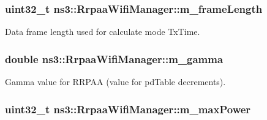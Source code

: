 \subsubsection[{\texorpdfstring{m\+\_\+frame\+Length}{m_frameLength}}]{\setlength{\rightskip}{0pt plus 5cm}uint32\+\_\+t ns3\+::\+Rrpaa\+Wifi\+Manager\+::m\+\_\+frame\+Length\hspace{0.3cm}{\ttfamily [private]}}\hypertarget{classns3_1_1RrpaaWifiManager_ae5f18f7b27c353b749aaddf404c6b3df}{}\label{classns3_1_1RrpaaWifiManager_ae5f18f7b27c353b749aaddf404c6b3df}


Data frame length used for calculate mode Tx\+Time. 

\subsubsection[{\texorpdfstring{m\+\_\+gamma}{m_gamma}}]{\setlength{\rightskip}{0pt plus 5cm}double ns3\+::\+Rrpaa\+Wifi\+Manager\+::m\+\_\+gamma\hspace{0.3cm}{\ttfamily [private]}}\hypertarget{classns3_1_1RrpaaWifiManager_ac328ed40e8e145afd21934caf52898b4}{}\label{classns3_1_1RrpaaWifiManager_ac328ed40e8e145afd21934caf52898b4}


Gamma value for R\+R\+P\+AA (value for pd\+Table decrements). 

\subsubsection[{\texorpdfstring{m\+\_\+max\+Power}{m_maxPower}}]{\setlength{\rightskip}{0pt plus 5cm}uint32\+\_\+t ns3\+::\+Rrpaa\+Wifi\+Manager\+::m\+\_\+max\+Power\hspace{0.3cm}{\ttfamily [private]}}\hypertarget{classns3_1_1RrpaaWifiManager_a8f5659ec5d99c385dcde039364b0ec8a}{}\label{classns3_1_1RrpaaWifiManager_a8f5659ec5d99c385dcde039364b0ec8a}


